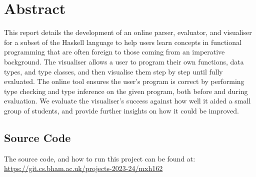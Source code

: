 
\section*{Abstract}
This report details the development of an online parser, evaluator, and visualiser for a subset of the Haskell language to help users learn concepts in functional programming that are often foreign to those coming from an imperative background. The visualiser allows a user to program their own functions, data types, and type classes, and then visualise them step by step until fully evaluated. The online tool ensures the user's program is correct by performing type checking and type inference on the given program, both before and during evaluation. We evaluate the visualiser's success against how well it aided a small group of students, and provide further insights on how it could be improved.

\vfill{}
\subsection*{Source Code}
The source code, and how to run this project can be found at:
\\\href{https://git.cs.bham.ac.uk/projects-2023-24/mxh162}{https://git.cs.bham.ac.uk/projects-2023-24/mxh162}